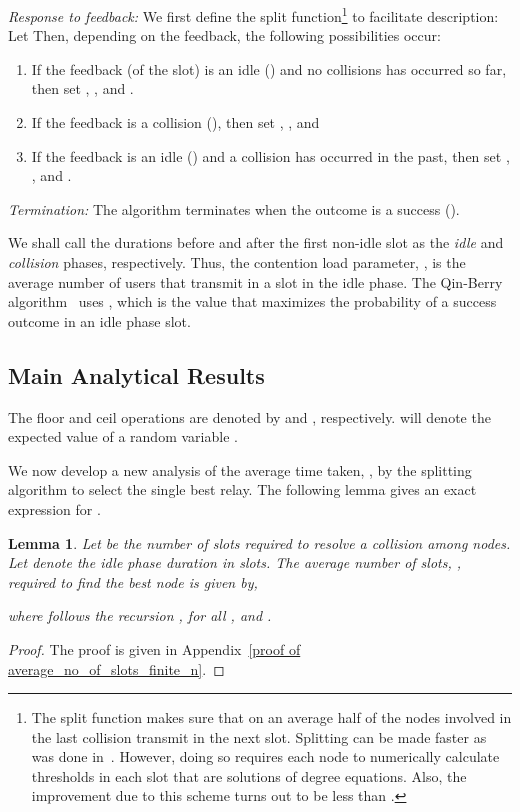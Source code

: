 \documentclass[12pt,draftcls,peerreview, onecolumn]{IEEEtran}
\newtheorem{lemma}{{\bf Lemma}}
\begin{document}
{\em Response to feedback:} We first define the split
function\footnote{The split function makes sure that on an average
  half of the nodes involved in the last collision transmit in the
  next slot.  Splitting can be made faster as was done
  in~\cite{cohen_1995_Cybernetics}. However, doing so requires each
  node to numerically calculate thresholds in each slot that are
  solutions of degree  equations. Also, the improvement due to
  this scheme turns out to be less than .}  to facilitate
description: Let  Then, depending on the
feedback, the following possibilities occur:
\begin{enumerate}
\item If the feedback (of the  slot) is an idle () and no collisions has occurred so far, then set ,
  , and  \mbox{}.


\item If the feedback is a collision (), then set \mbox{}, , and
  

\item If the feedback is an idle () and a collision has occurred in
  the past, then set , , and .
\end{enumerate}
{\em Termination:} The algorithm terminates when the outcome is a
success ().


We shall call the durations before and after the first non-idle slot
as the {\it idle} and {\it collision} phases, respectively.  Thus, the
contention load parameter, , is the average number of users that
transmit in a slot in the idle phase. The Qin-Berry
algorithm~\cite{qin_infocomm_2004} uses , which is the value
that maximizes the probability of a success outcome in an idle phase
slot.

\subsection{Main Analytical Results}

The floor and ceil operations are denoted by  and
, respectively.  will denote the expected value
of a random variable .

We now develop a new analysis of the average time taken,
, by the splitting algorithm to select the single
best relay. The following lemma gives an exact expression for
.
\begin{lemma}
\label{average_no_of_slots_finite_n}
Let  be the number of slots required to resolve a collision among
 nodes.  Let  denote the idle phase
duration in slots. The average number of slots, ,
required to find the best node is given by,

where  follows the recursion , for all , and
.
\end{lemma}
\begin{proof}
The proof is given in Appendix~\ref{proof of average_no_of_slots_finite_n}.
\end{proof}
\end{document}
